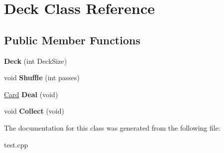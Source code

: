 \hypertarget{classDeck}{\section{Deck Class Reference}
\label{classDeck}
}
\subsection*{Public Member Functions}
\begin{DoxyCompactItemize}
\item 
\hypertarget{classDeck_ab9891a25673485939c3be257c72e5f2a}{{\bfseries Deck} (int Deck\-Size)}\label{classDeck_ab9891a25673485939c3be257c72e5f2a}

\item 
\hypertarget{classDeck_a77cf52fba404fa60588b40d372fd758b}{void {\bfseries Shuffle} (int passes)}\label{classDeck_a77cf52fba404fa60588b40d372fd758b}

\item 
\hypertarget{classDeck_a9f9bad49093acb715964e313928d8de3}{\hyperlink{structCard}{Card} {\bfseries Deal} (void)}\label{classDeck_a9f9bad49093acb715964e313928d8de3}

\item 
\hypertarget{classDeck_ae61c7d9825ef15e0295da8b153881b64}{void {\bfseries Collect} (void)}\label{classDeck_ae61c7d9825ef15e0295da8b153881b64}

\end{DoxyCompactItemize}


The documentation for this class was generated from the following file\-:\begin{DoxyCompactItemize}
\item 
test.\-cpp\end{DoxyCompactItemize}
